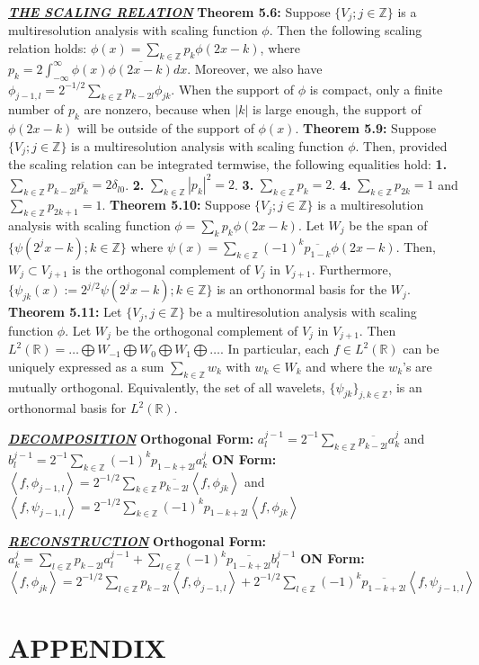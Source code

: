 \documentclass[a4paper]{article}
\newcommand{\R}{\mathbb{R}}
\newcommand{\Z}{\mathbb{Z}}
\begin{document}
\begin{multicols}{2}
\underline{\textsl{\bf THE SCALING RELATION}}
{\bf Theorem 5.6:} Suppose $\{V_j; j\in\Z\}$ is a multiresolution analysis with scaling function $\phi$. Then the following scaling relation holds: $\phi(x) = \sum_{k\in\Z} p_k\phi(2x - k)$, where $p_k = 2\int_{-\infty}^{\infty}\phi(x)\overline{\phi(2x - k)}dx$. Moreover, we also have $\phi_{j-1,l}=2^{-1/2}\sum_{k\in\Z}p_{k-2l}\phi_{jk}$.  When the support of $\phi$ is compact, only a finite number of $p_k$ are nonzero, because when $|k|$ is large enough, the support of $\phi(2x - k)$ will be outside of the support of $\phi(x)$.
{\bf Theorem 5.9:} Suppose $\{V_j; j\in\Z\}$ is a multiresolution analysis with scaling function $\phi$. Then, provided the scaling relation can be integrated termwise, the following equalities hold: {\bf 1.} $\sum_{k\in\Z}p_{k-2l}\overline{p_k}=2\delta_{l0}$. {\bf 2.} $\sum_{k\in\Z}|p_{k}|^2=2$. {\bf 3.} $\sum_{k\in\Z}p_{k}=2$. {\bf 4.} $\sum_{k\in\Z}p_{2k}=1$ and $\sum_{k\in\Z}p_{2k+1}=1$.
{\bf Theorem 5.10:} Suppose $\{V_j; j\in\Z\}$ is a multiresolution analysis with scaling function $\phi = \sum_{k}p_{k}\phi(2x-k)$.  Let $W_j$ be the span of $\{\psi(2^jx-k); k\in\Z\}$ where $\psi(x) = \sum_{k\in\Z}(-1)^{k}\overline{p_{1-k}}\phi(2x-k)$. Then, $W_j\subset V_{j+1}$ is the orthogonal complement of $V_j$ in $V_{j+1}$. Furthermore, $\{\psi_{jk}(x) := 2^{j/2}\psi(2^jx - k); k\in\Z\}$ is an orthonormal basis for the $W_j$.
{\bf Theorem 5.11:} Let $\{V_j, j\in\Z\}$ be a multiresolution analysis with scaling function $\phi$. Let $W_j$ be the orthogonal complement of $V_j$ in $V_{j+1}$. Then $L^2(\R)=\dots\bigoplus W_{-1}\bigoplus W_{0}\bigoplus W_{1}\bigoplus\dots$. In particular, each $f\in L^2(\R)$ can be uniquely expressed as a sum $\sum_{k\in\Z}w_k$ with $w_k\in W_k$ and where the $w_k$'s are mutually orthogonal. Equivalently, the set of all wavelets, $\{\psi_{jk}\}_{j,k\in\Z}$, is an orthonormal basis for $L^2(\R)$. 

\underline{\textsl{\bf DECOMPOSITION}}
{\bf Orthogonal Form:} $a^{j-1}_l = 2^{-1}\sum_{k\in\Z}\overline{p_{k-2l}}a_k^j$ and $b^{j-1}_l = 2^{-1}\sum_{k\in\Z}(-1)^kp_{1-k+2l}a_k^j$
{\bf ON Form:} $\left\langle f,\phi_{j-1,l}\right\rangle = 2^{-1/2}\sum_{k\in\Z}\overline{p_{k-2l}}\left\langle f,\phi_{jk}\right\rangle$ and $\left\langle f,\psi_{j-1,l}\right\rangle = 2^{-1/2}\sum_{k\in\Z}(-1)^kp_{1-k+2l}\left\langle f,\phi_{jk}\right\rangle$

\underline{\textsl{\bf RECONSTRUCTION}}
{\bf Orthogonal Form:} $a^{j}_k = \sum_{l\in\Z}p_{k-2l}a_l^{j-1}+\sum_{l\in\Z}(-1)^k\overline{p_{1-k+2l}}b_l^{j-1}$
{\bf ON Form:} $\left\langle f,\phi_{jk}\right\rangle = 2^{-1/2}\sum_{l\in\Z}p_{k-2l}\left\langle f,\phi_{j-1,l}\right\rangle+2^{-1/2}\sum_{l\in\Z}(-1)^k\overline{p_{1-k+2l}}\left\langle f,\psi_{j-1,l}\right\rangle$
\section*{APPENDIX}


\end{multicols}
\end{document}
